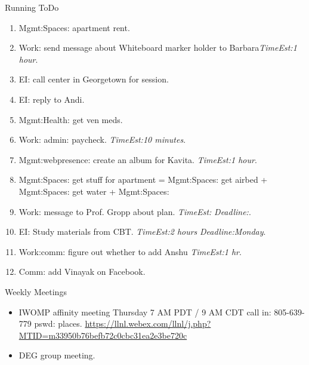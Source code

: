 \documentclass[serif, mathserif, final]{beamer}
\newcommand{\te}[1]{\textit{TimeEst:}\textit{#1}}
\newcommand{\dl}[1]{\textit{Deadline:}\textit{#1}}
\begin{document}
\begin{frame}
\begin{columns}
\begin{column}{0.5\linewidth}
\begin{block}{Running ToDo}
\begin{enumerate}
  \item \tiny Mgmt:Spaces: apartment rent. 
      
  \item \tiny Work: send message about Whiteboard marker holder to
    Barbara\te{1 hour}. 

  \item \tiny EI: call center in Georgetown for session. 
  \item \tiny EI: reply to Andi.

  \item \tiny Mgmt:Health: get ven meds. 
  \item \tiny Work: admin: paycheck. \te{10 minutes}. 
  \item \tiny Mgmt:webpresence: create an album for Kavita. \te{1
    hour}. 

  \item \tiny Mgmt:Spaces: get stuff for apartment = Mgmt:Spaces: get
    airbed  + Mgmt:Spaces: get water + Mgmt:Spaces:  
  \item \tiny Work: message to Prof. Gropp about plan. \te{} \dl{}.
  \item \tiny EI: Study materials from CBT.  \te{2 hours} \dl{Monday}.
  \item \tiny Work:comm: figure out whether to add Anshu \te{1 hr}. 
  \item \tiny Comm: add Vinayak on Facebook. 
    \end{enumerate}
  \end{block}

  \begin{block}{Weekly Meetings}
    \begin{itemize}
      \tiny \item \tiny IWOMP affinity meeting Thursday 7 AM PDT / 9 AM
      CDT call in: 805-639-779 pswd: places. \url{https://llnl.webex.com/llnl/j.php?MTID=m33950b76befb72c0cbc31ea2e3be720c}
    \item \tiny DEG group meeting.  
    \end{itemize}
  \end{block} 


\end{column}
\end{columns}
\end{frame}
\end{document}
